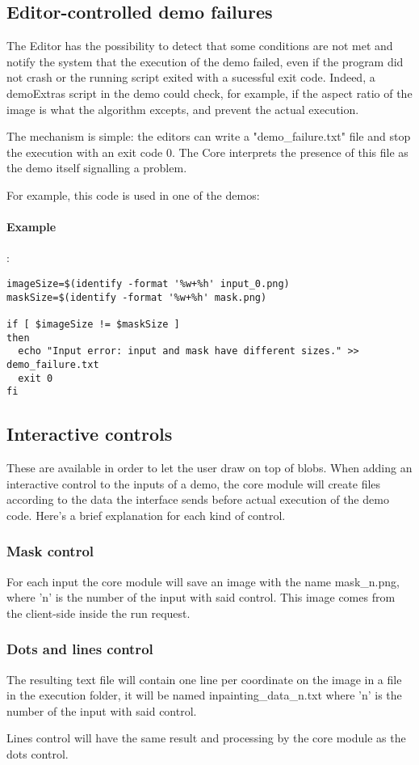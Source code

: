 \subsection{Editor-controlled demo failures}
The Editor has the possibility to detect that some conditions are not met and notify the system that the execution of the demo failed, even if the program did not crash or the running script exited with a sucessful exit code. Indeed, a demoExtras script in the demo could check, for example, if the aspect ratio of the image is what the algorithm excepts, and prevent the actual execution.

The mechanism is simple: the editors can write a "demo\_failure.txt" file and stop the execution with an exit
code 0. The Core interprets the presence of this file as the demo itself signalling a problem.

For example, this code is used in one of the demos:
\paragraph{Example}:\\
\begin{verbatim}
imageSize=$(identify -format '%w+%h' input_0.png)
maskSize=$(identify -format '%w+%h' mask.png)

if [ $imageSize != $maskSize ]
then
  echo "Input error: input and mask have different sizes." >> demo_failure.txt
  exit 0
fi
\end{verbatim} 


\subsection{Interactive controls}
These are available in order to let the user draw on top of blobs. When adding an interactive control to the inputs of a demo, the core module will create files according to the data the interface sends before actual execution of the demo code. Here's a brief explanation for each kind of control.

\subsubsection{Mask control}
 For each input the core module will save an image with the name mask\_n.png, where 'n' is the number of the input with said control. This image comes from the client-side inside the run request.

\subsubsection{Dots and lines control}
The resulting text file will contain one line per coordinate on the image in a file in the execution folder, it will be named inpainting\_data\_n.txt where 'n' is the number of the input with said control.

Lines control will have the same result and processing by the core module as the dots control.